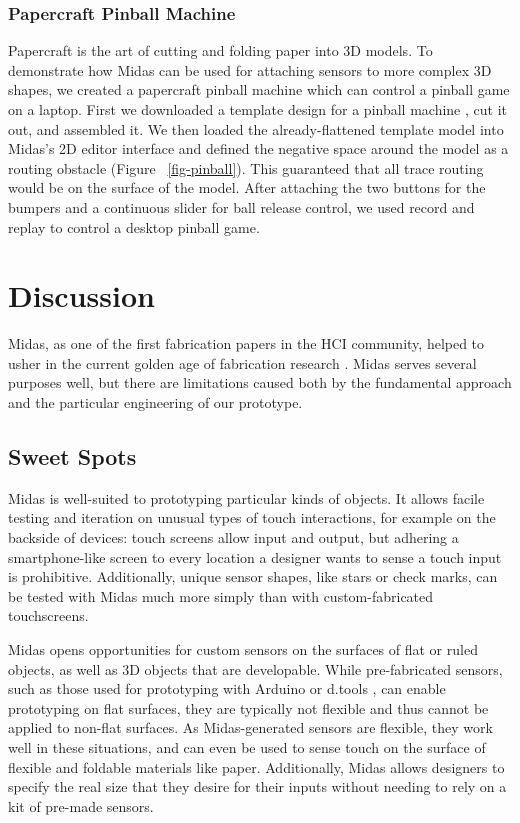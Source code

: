         \subsubsection{Papercraft Pinball Machine}
Papercraft is the art of cutting and folding paper into 3D models. To demonstrate how Midas can be used for attaching sensors to more complex 3D shapes, 
we created a papercraft pinball machine which can control a pinball game on a laptop. First we downloaded a template design for a pinball machine \cite{indianajones}, cut it out, and assembled it.  We then loaded the already-flattened template model into Midas's 2D editor interface and defined the negative space around the model as a routing obstacle (Figure ~\ref{fig-pinball}). This guaranteed that all trace routing would be on the surface of the model. After attaching the two buttons for the bumpers and a continuous slider for ball release control, we used record and replay to control a desktop pinball game.


\section{Discussion}

    Midas, as one of the first fabrication papers in the HCI community, helped to usher in the current golden age of fabrication research . Midas serves several purposes well, but there are limitations caused both by the fundamental approach and the particular engineering of our prototype.

    \subsection{Sweet Spots}
    
    Midas is well-suited to prototyping particular kinds of objects. It allows facile testing and iteration on unusual types of touch interactions, for example on the backside of devices: touch screens allow input and output, but adhering a smartphone-like screen to every location a designer wants to sense a touch input is prohibitive. Additionally, unique sensor shapes, like stars or check marks, can be tested with Midas much more simply than with custom-fabricated touchscreens.
    
    Midas opens opportunities for custom sensors on the surfaces of flat or ruled objects, as well as 3D objects that are developable. While pre-fabricated sensors, such as those used for prototyping with Arduino \cite{arduino} or d.tools \cite{hartmann-dtools}, can enable prototyping on flat surfaces, they are typically not flexible and thus cannot be applied to non-flat surfaces. As Midas-generated sensors are flexible, they work well in these situations, and can even be used to sense touch on the surface of flexible and foldable materials like paper. Additionally, Midas allows designers to specify the real size that they desire for their inputs without needing to rely on a kit of pre-made sensors.

